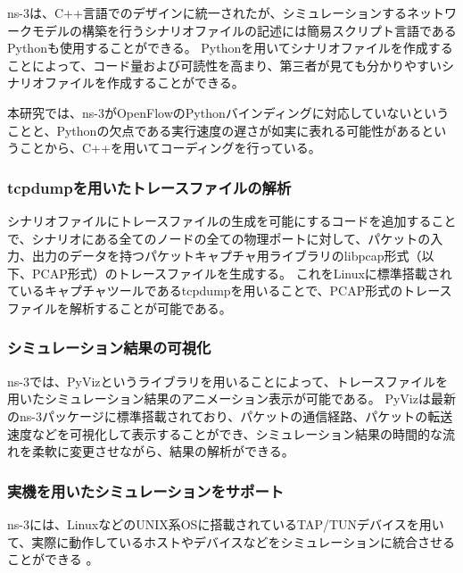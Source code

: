 ns-3は、C++言語でのデザインに統一されたが、シミュレーションするネットワークモデルの構築を行うシナリオファイルの記述には簡易スクリプト言語であるPythonも使用することができる。
Pythonを用いてシナリオファイルを作成することによって、コード量および可読性を高まり、第三者が見ても分かりやすいシナリオファイルを作成することができる。

本研究では、ns-3がOpenFlowのPythonバインディングに対応していないということと、Pythonの欠点である実行速度の遅さが如実に表れる可能性があるということから、C++を用いてコーディングを行っている。

\subsubsection{tcpdumpを用いたトレースファイルの解析}

シナリオファイルにトレースファイルの生成を可能にするコードを追加することで、シナリオにある全てのノードの全ての物理ポートに対して、パケットの入力、出力のデータを持つパケットキャプチャ用ライブラリのlibpcap形式（以下、PCAP形式）のトレースファイルを生成する。
これをLinuxに標準搭載されているキャプチャツールであるtcpdumpを用いることで、PCAP形式のトレースファイルを解析することが可能である。

\subsubsection{シミュレーション結果の可視化}

ns-3では、PyVizというライブラリを用いることによって、トレースファイルを用いたシミュレーション結果のアニメーション表示が可能である。
PyVizは最新のns-3パッケージに標準搭載されており、パケットの通信経路、パケットの転送速度などを可視化して表示することができ、シミュレーション結果の時間的な流れを柔軟に変更させながら、結果の解析ができる。

\subsubsection{実機を用いたシミュレーションをサポート}


ns-3には、LinuxなどのUNIX系OSに搭載されているTAP/TUNデバイスを用いて、実際に動作しているホストやデバイスなどをシミュレーションに統合させることができる \cite{tapdevice}。


